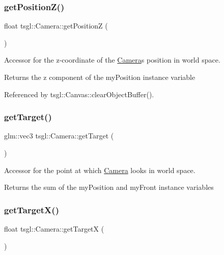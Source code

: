 \subsubsection{\texorpdfstring{get\+Position\+Z()}{getPositionZ()}}
{\footnotesize\ttfamily float tsgl\+::\+Camera\+::get\+PositionZ (\begin{DoxyParamCaption}{ }\end{DoxyParamCaption})}



Accessor for the z-\/coordinate of the \hyperlink{classtsgl_1_1_camera}{Camera}\textquotesingle{}s position in world space. 

Returns the z component of the my\+Position instance variable 

Referenced by tsgl\+::\+Canvas\+::clear\+Object\+Buffer().

\mbox{\label{classtsgl_1_1_camera_a8c6c19acef5dffc6dfc2aff31428d2e1}} 
\subsubsection{\texorpdfstring{get\+Target()}{getTarget()}}
{\footnotesize\ttfamily glm\+::vec3 tsgl\+::\+Camera\+::get\+Target (\begin{DoxyParamCaption}{ }\end{DoxyParamCaption})}



Accessor for the point at which \hyperlink{classtsgl_1_1_camera}{Camera} looks in world space. 

Returns the sum of the my\+Position and my\+Front instance variables \mbox{\label{classtsgl_1_1_camera_ad5778df0178d7926bdb2da22556b03b0}} 
\subsubsection{\texorpdfstring{get\+Target\+X()}{getTargetX()}}
{\footnotesize\ttfamily float tsgl\+::\+Camera\+::get\+TargetX (\begin{DoxyParamCaption}{ }\end{DoxyParamCaption})}



